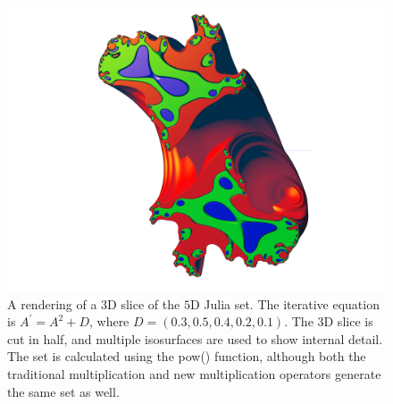 \documentclass[12pt]{article}
\begin{document}
\begin{figure} 
\centering
  \includegraphics[width = 6 in]{rgb2.png}
  \caption{A rendering of a $3$D slice of the $5$D Julia set.
The iterative equation is $A^{\prime} = A^2 + D$, where $D = (0.3, 0.5, 0.4, 0.2, 0.1)$.
The $3$D slice is cut in half, and multiple isosurfaces are used to show internal detail.
The set is calculated using the pow() function, although both the traditional multiplication and new multiplication operators generate the same set as well.
}
\end{figure}
\end{document}
